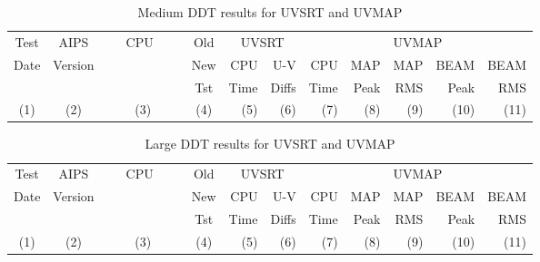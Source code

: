 \begin{table}
\begin{center}
\begin{tabular}{cccc|rr|rrrrr}
\hline \hline
Test      &  AIPS    &~~~CPU~~~~& Old  &  \multicolumn{2}{c|}{UVSRT}&   \multicolumn{5}{c}{UVMAP}  \\
  Date    & Version  &          & New  &   CPU    &    U-V    &    CPU    &    MAP    &    MAP    &   BEAM    &   BEAM   \\
          &          &          & Tst  &  Time    &   Diffs   &   Time    &   Peak    &    RMS    &   Peak    &    RMS   \\

  (1)     &   (2)    &  (3)     & (4)  & (5)      &   (6)     &   (7)     &   (8)     &    (9)    &   (10)    &  (11)   \\
\hline

\hline \hline
\end{tabular}
\end{center}
\caption{Medium DDT results for UVSRT and UVMAP}
\end{table}

\begin{table}
\begin{center}
\begin{tabular}{cccc|rr|rrrrr}
\hline \hline
Test      &  AIPS    &~~~CPU~~~~& Old  &  \multicolumn{2}{c|}{UVSRT}&   \multicolumn{5}{c}{UVMAP}  \\
  Date    & Version  &          & New  &   CPU    &    U-V    &    CPU    &    MAP    &    MAP    &   BEAM    &   BEAM   \\
          &          &          & Tst  &  Time    &   Diffs   &   Time    &   Peak    &    RMS    &   Peak    &    RMS   \\

  (1)     &   (2)    &  (3)     & (4)  & (5)      &   (6)     &   (7)     &   (8)     &    (9)    &   (10)    &  (11)   \\
\hline

\hline \hline
\end{tabular}
\end{center}
\caption{Large DDT results for UVSRT and UVMAP}
\end{table}

\clearpage

